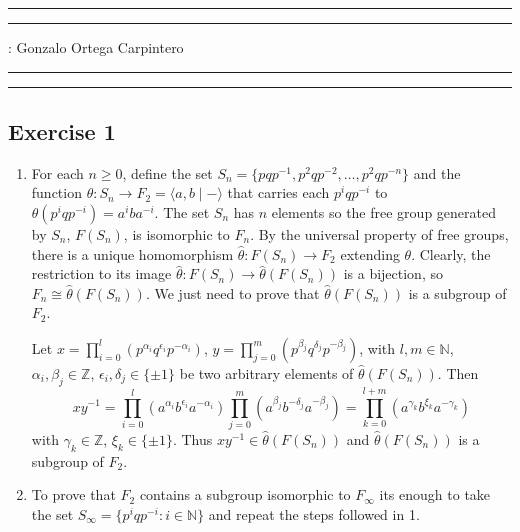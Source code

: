 \documentclass[11pt,a4paper]{article}
\newcommand{\Z}{\mathbb Z}
\newcommand{\N}{\mathbb N}
\begin{document}
\hrule\hrule
\vspace{1mm}


\vspace{1mm}

 : Gonzalo Ortega Carpintero
\vspace{2mm}

\hrule\hrule

\subsection*{Exercise 1}
\begin{enumerate}
  \item For each $ n \geq 0 $, define the set $ S_n = \{p q p^{-1}, p^2 q p^{-2}, \dots, p^2 q p^{-n}\} $ and the function $ \theta \colon S_n \to F_2 = \langle a, b \mid -\rangle $ that carries each $ p^i q p^{-i} $ to $ \theta(p^i q p^{-i}) = a^i b a^{-i} $. The set $ S_n $ has $ n $ elements so the free group generated by $ S_n $, $F(S_n)$, is isomorphic to $ F_n $. By the universal property of free groups, there is a unique homomorphism $ \hat \theta \colon F(S_n) \to F_2 $ extending $ \theta $. Clearly, the restriction to its image $ \hat \theta \colon F(S_n) \to \hat \theta (F(S_n)) $ is a bijection, so $ F_n \cong \hat \theta(F(S_n)) $. We just need to prove that $ \hat \theta(F(S_n)) $ is a subgroup of $ F_2 $.

  Let $ x = \prod_{i=0}^{l}(p^{\alpha_i} q^{\epsilon_i} p^{-\alpha_i}) $,
  $ y = \prod_{j=0}^{m}(p^{\beta_j} q^{\delta_j} p^{-\beta_j}) $, with $l, m \in \N $, $\alpha_i, \beta_j \in \Z $, $\epsilon_i, \delta_j \in \{ \pm 1\} $ be two arbitrary elements of $ \hat \theta( F(S_n))$. Then
  $$
    xy^{-1} = \prod_{i=0}^{l}(a^{\alpha_i} b^{\epsilon_i} a^{-\alpha_i})
    \prod_{j=0}^{m}(a^{\beta_j} b^{-\delta_j} a^{-\beta_j}) = \prod_{k=0}^{l + m} (a^{\gamma_k} b^{\xi_k} a^{-\gamma_k})  
  $$
  with $ \gamma_k \in \Z $, $ \xi_k \in \{ \pm 1\} $. Thus $ xy^{-1} \in \hat \theta(F(S_n)) $ and $ \hat \theta(F(S_n)) $ is a subgroup of $ F_2 $.

  \item To prove that $ F_2 $ contains a subgroup isomorphic to $ F_\infty $ its enough to take the set $ S_\infty = \{p^i q p^{-i} : i \in \N \} $ and repeat the steps followed in 1.
\end{enumerate}
\end{document}
